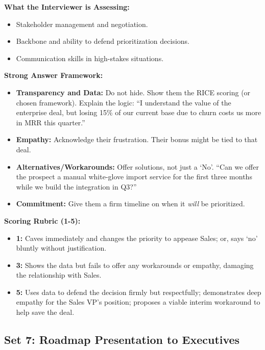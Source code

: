 \documentclass[
  11pt,
  openany,
  oneside]{book}
\providecommand{\tightlist}{%
  \setlength{\itemsep}{0pt}\setlength{\parskip}{0pt}}
\begin{document}
\textbf{What the Interviewer is Assessing:}

\begin{itemize}
\tightlist
\item
  Stakeholder management and negotiation.
\item
  Backbone and ability to defend prioritization decisions.
\item
  Communication skills in high-stakes situations.
\end{itemize}

\textbf{Strong Answer Framework:}

\begin{itemize}
\tightlist
\item
  \textbf{Transparency and Data:} Do not hide. Show them the RICE
  scoring (or chosen framework). Explain the logic: ``I understand the
  value of the enterprise deal, but losing 15\% of our current base due
  to churn costs us more in MRR this quarter.''
\item
  \textbf{Empathy:} Acknowledge their frustration. Their bonus might be
  tied to that deal.
\item
  \textbf{Alternatives/Workarounds:} Offer solutions, not just a `No'.
  ``Can we offer the prospect a manual white-glove import service for
  the first three months while we build the integration in Q3?''
\item
  \textbf{Commitment:} Give them a firm timeline on when it \emph{will}
  be prioritized.
\end{itemize}

\textbf{Scoring Rubric (1-5):}

\begin{itemize}
\tightlist
\item
  \textbf{1:} Caves immediately and changes the priority to appease
  Sales; or, says `no' bluntly without justification.
\item
  \textbf{3:} Shows the data but fails to offer any workarounds or
  empathy, damaging the relationship with Sales.
\item
  \textbf{5:} Uses data to defend the decision firmly but respectfully;
  demonstrates deep empathy for the Sales VP's position; proposes a
  viable interim workaround to help save the deal.
\end{itemize}

\bigskip

\subsection{Set 7: Roadmap Presentation to
Executives}\label{set-7-roadmap-presentation-to-executives}
\end{document}
